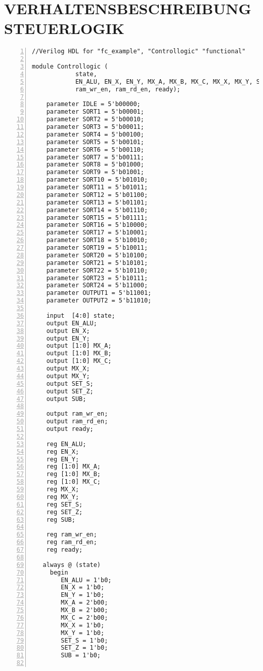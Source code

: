 \section{VERHALTENSBESCHREIBUNG STEUERLOGIK}
\begin{lstlisting}[numbers=left,xleftmargin=1em, multicols=2,frame=leftline, basicstyle = \small\ttfamily]
//Verilog HDL for "fc_example", "Controllogic" "functional"

module Controllogic (
            state,
            EN_ALU, EN_X, EN_Y, MX_A, MX_B, MX_C, MX_X, MX_Y, SET_S, SET_Z, SUB,
            ram_wr_en, ram_rd_en, ready);
    
    parameter IDLE = 5'b00000;
    parameter SORT1 = 5'b00001;
    parameter SORT2 = 5'b00010;
    parameter SORT3 = 5'b00011;
    parameter SORT4 = 5'b00100;
    parameter SORT5 = 5'b00101;
    parameter SORT6 = 5'b00110;
    parameter SORT7 = 5'b00111;
    parameter SORT8 = 5'b01000;
    parameter SORT9 = 5'b01001;
    parameter SORT10 = 5'b01010;
    parameter SORT11 = 5'b01011;
    parameter SORT12 = 5'b01100;
    parameter SORT13 = 5'b01101;
    parameter SORT14 = 5'b01110;
    parameter SORT15 = 5'b01111;
    parameter SORT16 = 5'b10000;
    parameter SORT17 = 5'b10001;
    parameter SORT18 = 5'b10010;
    parameter SORT19 = 5'b10011;
    parameter SORT20 = 5'b10100;
    parameter SORT21 = 5'b10101;
    parameter SORT22 = 5'b10110;
    parameter SORT23 = 5'b10111;
    parameter SORT24 = 5'b11000;
    parameter OUTPUT1 = 5'b11001;
    parameter OUTPUT2 = 5'b11010;
    
    input  [4:0] state;
    output EN_ALU;
    output EN_X;
    output EN_Y;
    output [1:0] MX_A;
    output [1:0] MX_B;
    output [1:0] MX_C;
    output MX_X;
    output MX_Y;
    output SET_S;
    output SET_Z;
    output SUB;
    
    output ram_wr_en;
    output ram_rd_en;
    output ready;
    
    reg	EN_ALU;
    reg EN_X;
    reg EN_Y;
    reg [1:0] MX_A;
    reg [1:0] MX_B;
    reg [1:0] MX_C;
    reg MX_X;
    reg MX_Y;
    reg SET_S;
    reg SET_Z;
    reg SUB;
        
    reg ram_wr_en;
    reg ram_rd_en;
    reg ready;
    
   always @ (state)
     begin
        EN_ALU = 1'b0;
        EN_X = 1'b0;
        EN_Y = 1'b0;
        MX_A = 2'b00;
        MX_B = 2'b00;
        MX_C = 2'b00;
        MX_X = 1'b0;
        MX_Y = 1'b0;
        SET_S = 1'b0;
        SET_Z = 1'b0;
        SUB = 1'b0;
        

\end{lstlisting}
